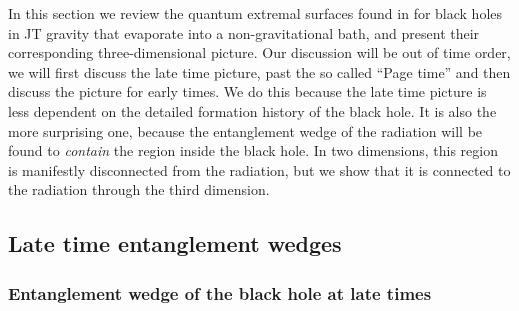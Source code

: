 \documentclass[11pt]{article}
\begin{document}
In this section we review the quantum extremal surfaces found in \cite{Almheiri:2019psf} for black holes in JT gravity that evaporate into a non-gravitational bath, and present their corresponding three-dimensional picture.
Our discussion will be out of time order, we will first discuss the late time picture, past the so called ``Page time'' and then discuss the picture for early times. 
We do this because the late time picture is less dependent on the detailed formation history of the black hole. 
It is also the more surprising one, because the entanglement wedge of the radiation will be found to \emph{contain} the region inside the black hole. 
In two dimensions, this region is manifestly disconnected from the radiation, but we show that it is connected to the radiation through the third dimension.
  
\subsection{Late time entanglement wedges}

\subsubsection{Entanglement wedge of the black hole at late times} 
  
\end{document}
